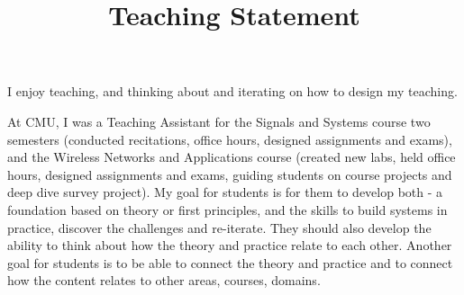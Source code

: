\documentclass[10pt]{article}
\date{}
\begin{document}


\title{{\Large Teaching Statement}}
\vspace{-1em}
\maketitle

\vspace{-6em}


I enjoy teaching, and thinking about and iterating on how to design my teaching. 

At CMU, I was a Teaching Assistant for the Signals and Systems course two semesters (conducted recitations, office hours, designed assignments and exams), and the Wireless Networks and Applications course (created new labs, held office hours, designed assignments and exams, guiding students on course projects and deep dive survey project).
My goal for students is for them to develop both - a foundation based on theory or first principles, and the skills to build systems in practice, discover the challenges and re-iterate. They should also develop the ability to think about how the theory and practice relate to each other. Another goal for students is to be able to connect the theory and practice and to connect how the content relates to other areas, courses, domains. 
\end{document}
